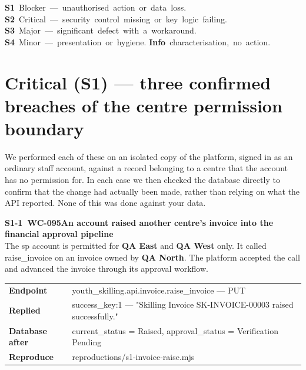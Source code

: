 \documentclass[10pt,a4paper]{article}
\newcommand{\display}{\sffamily}
\newcommand{\code}[1]{{\ttfamily #1}}
\begin{document}
{\footnotesize\color{muted}\raggedright
\mbox{\textbf{S1} Blocker — unauthorised action or data loss.}\quad
\mbox{\textbf{S2} Critical — security control missing or key logic failing.}\quad
\mbox{\textbf{S3} Major — significant defect with a workaround.}\quad
\mbox{\textbf{S4} Minor — presentation or hygiene.}\quad
\mbox{\textbf{Info} characterisation, no action.}\par}

\section{Critical (S1) — three confirmed breaches of the centre permission boundary}

We performed each of these on an isolated copy of the platform, signed in as an ordinary staff
account, against a record belonging to a centre that the account has no permission for. In each
case we then checked the database directly to confirm that the change had actually been made,
rather than relying on what the API reported. None of this was done against your data.

\vspace{0.5em}

{\display\small\bfseries\color{sevone}S1-1~{\footnotesize\color{muted}WC-095}\quad An account raised another centre's invoice into the financial approval pipeline}\\[0.35em]
The \code{sp} account is permitted for \textbf{QA East} and \textbf{QA West} only. It called
\code{raise\_invoice} on an invoice owned by \textbf{QA North}. The platform accepted the call and
advanced the invoice through its approval workflow.

\vspace{0.3em}
{\footnotesize
\begin{tabularx}{\textwidth}{@{}p{2.45cm}L@{}}
\textbf{Endpoint} & \code{youth\_skilling.api.invoice.raise\_invoice} — \code{PUT} \\
\textbf{Replied} & \code{success\_key:1} — "Skilling Invoice SK-INVOICE-00003 raised successfully." \\
\textbf{Database after} & \code{current\_status = Raised}, \code{approval\_status = Verification Pending} \\
\textbf{Reproduce} & \code{reproductions/s1-invoice-raise.mjs} \\
\end{tabularx}\par}
\end{document}
